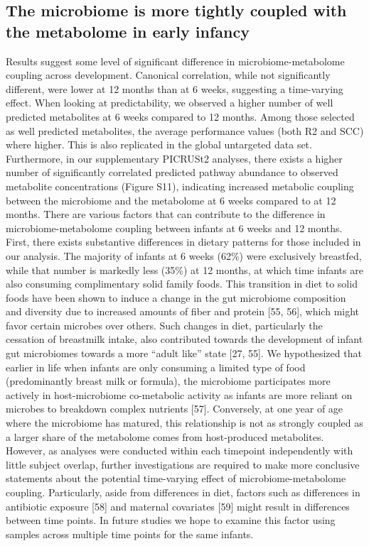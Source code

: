\subsection{The microbiome is more tightly coupled with the metabolome in early infancy} 
Results suggest some level of significant difference in microbiome-metabolome coupling across development. Canonical correlation, while not significantly different, were lower at 12 months than at 6 weeks, suggesting a time-varying effect. When looking at predictability, we observed a higher number of well predicted metabolites at 6 weeks compared to 12 months. Among those selected as well predicted metabolites, the average performance values (both R2 and SCC) where higher. This is also replicated in the global untargeted data set. Furthermore, in our supplementary PICRUSt2 analyses, there exists a higher number of significantly correlated predicted pathway abundance to observed metabolite concentrations (Figure S11), indicating increased metabolic coupling between the microbiome and the metabolome at 6 weeks compared to at 12 months.  
There are various factors that can contribute to the difference in microbiome-metabolome coupling between infants at 6 weeks and 12 months. First, there exists substantive differences in dietary patterns for those included in our analysis. The majority of infants at 6 weeks (62\%) were exclusively breastfed, while that number is markedly less (35\%) at 12 months, at which time infants are also consuming complimentary solid family foods. This transition in diet to solid foods have been shown to induce a change in the gut microbiome composition and diversity due to increased amounts of fiber and protein [55, 56], which might favor certain microbes over others. Such changes in diet, particularly the cessation of breastmilk intake, also contributed towards the development of infant gut microbiomes towards a more “adult like” state [27, 55]. We hypothesized that earlier in life when infants are only consuming a limited type of food (predominantly breast milk or formula), the microbiome participates more actively in host-microbiome co-metabolic activity as infants are more reliant on microbes to breakdown complex nutrients [57]. Conversely, at one year of age where the microbiome has matured, this relationship is not as strongly coupled as a larger share of the metabolome comes from host-produced metabolites.  
However, as analyses were conducted within each timepoint independently with little subject overlap, further investigations are required to make more conclusive statements about the potential time-varying effect of microbiome-metabolome coupling. Particularly, aside from differences in diet, factors such as differences in antibiotic exposure [58] and maternal covariates [59] might result in differences between time points. In future studies we hope to examine this factor using samples across multiple time points for the same infants.  
